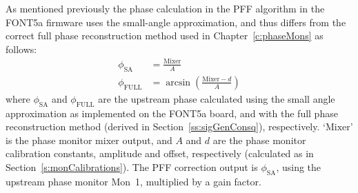 As mentioned previously the phase calculation in the PFF algorithm in the FONT5a firmware uses the small-angle approximation, and thus differs from the correct full phase reconstruction method used in Chapter~\ref{c:phaseMons} as follows:
\begin{align}
\phi_{\mathrm{SA}} &= \frac{\mathrm{Mixer}}{A} \\
\phi_{\mathrm{FULL}} &= \arcsin\left(\frac{\mathrm{Mixer}-d}{A}\right)
\end{align}
where \(\phi_{\mathrm{SA}}\) and \(\phi_{\mathrm{FULL}}\) are the upstream phase calculated using the small angle approximation as implemented on the FONT5a board,
and with the full phase reconstruction method (derived in Section~\ref{ss:sigGenConsq}), respectively. `\(\mathrm{Mixer}\)' is the phase monitor mixer output, and \(A\) and \(d\) are the phase monitor calibration constants, amplitude and offset, respectively (calculated as in Section~\ref{s:monCalibrations}).
The PFF correction output is \(\phi_{\mathrm{SA}}\), using the upstream 
phase monitor Mon~1, multiplied by a gain factor.


